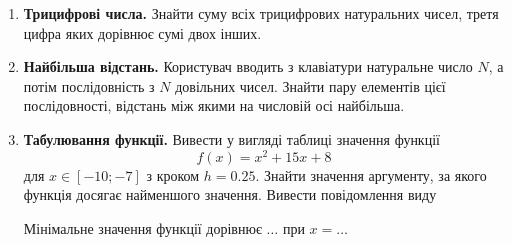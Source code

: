 \begin{enumerate}
\item \textbf{Трицифрові числа.} Знайти суму всіх трицифрових натуральних чисел, третя цифра яких дорівнює сумі двох інших.
\item \textbf{Найбільша відстань.} Користувач вводить з клавіатури натуральне число $N$, а потім по\-слі\-до\-вність з $N$ довільних чисел. Знайти пару елементів цієї послідовності, відстань між якими на числовій осі найбільша.
\item \textbf{Табулювання функції.} Вивести у вигляді таблиці значення функції
$$
f(x)=x^2+15x+8
$$
для $ x \in [-10; -7] $ з кроком $ h = 0.25 $. Знайти значення аргументу, за якого функція досягає найменшого значення. Вивести повідомлення виду

 {\ttfamily\color{blue} Мінімальне значення функції дорівнює $\ldots$  при  $x = \ldots $ }
\end{enumerate}



